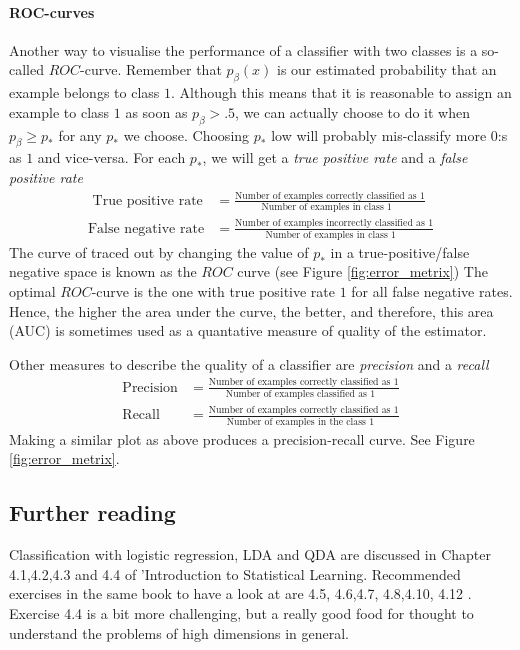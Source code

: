 \documentclass{article}
\begin{document}
\paragraph{ROC-curves} Another way to visualise the performance of a classifier with two classes is a so-called $ROC$-curve. Remember that $p_{\beta}(x)$ is our estimated probability that an example belongs to class $1$. Although this means that it is reasonable to assign an example to class $1$ as soon as $p_\beta>.5$, we can actually choose to do it when $p_\beta \geq p_*$ for any $p_*$ we choose. Choosing $p_*$ low will probably mis-classify more $0$:s as $1$ and vice-versa. For each $p_*$, we will get a \emph{true positive rate} and a \emph{false positive rate}
\begin{align*}
    \text{ True positive rate}&= \frac{\text{Number of examples correctly classified as $1$}}{\text{Number of examples in class $1$ }} \\
    \text{False negative rate}&= \frac{\text{Number of examples incorrectly classified as $1$}}{\text{Number of examples in class $1$ }}
\end{align*}
The curve of traced out by changing the value of $p_*$ in a true-positive/false negative space is known as the $ROC$ curve (see Figure \ref{fig:error_metrix}) The optimal $ROC$-curve is the one with true positive rate $1$ for all false negative rates. Hence, the higher the area under the curve, the better, and therefore, this area (AUC) is sometimes used as a quantative measure of quality of the estimator.

Other measures to describe the quality of a classifier are 
\emph{precision} and a \emph{recall}
\begin{align*}
    \text{Precision}&= \frac{\text{Number of examples correctly classified as $1$}}{\text{Number of examples classified as $1$ }} \\
    \text{Recall}&= \frac{\text{Number of examples correctly classified as $1$}}{\text{Number of examples in the class $1$ }}
\end{align*}
Making a similar plot as above produces a precision-recall curve. See Figure \ref{fig:error_metrix}.



\subsection{Further reading}
Classification with logistic regression, LDA and QDA are discussed in Chapter 4.1,4.2,4.3 and 4.4 of 'Introduction to Statistical Learning. Recommended exercises in the same book to have a look at are 4.5, 4.6,4.7, 4.8,4.10, 4.12 . Exercise 4.4 is a bit more challenging, but a really good food for thought to understand the problems of high dimensions in general.
\end{document}
